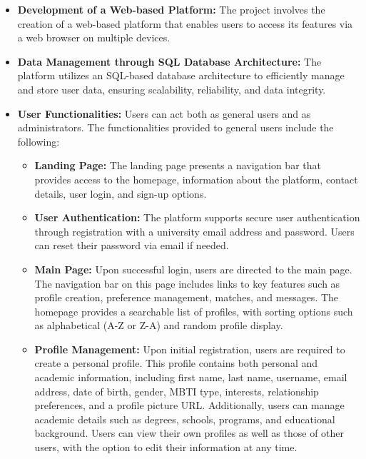 \begin{itemize} 

    \item \textbf{Development of a Web-based Platform:}
    The project involves the creation of a web-based platform that enables users to access its features via a web browser on multiple devices.
    
    \item \textbf{Data Management through SQL Database Architecture:}  
    The platform utilizes an SQL-based database architecture to efficiently manage and store user data, ensuring scalability, reliability, and data integrity.
    
    \item \textbf{User Functionalities:}  
    Users can act both as general users and as administrators. The functionalities provided to general users include the following:
    
    \begin{itemize}
        \item \textbf{Landing Page:}  
        The landing page presents a navigation bar that provides access to the homepage, information about the platform, contact details, user login, and sign-up options.

        \item \textbf{User Authentication:}  
        The platform supports secure user authentication through registration with a university email address and password. Users can reset their password via email if needed.
    
        \item \textbf{Main Page:}  
        Upon successful login, users are directed to the main page. The navigation bar on this page includes links to key features such as profile creation, preference management, matches, and messages.  The homepage provides a searchable list of profiles, with sorting options such as alphabetical (A-Z or Z-A) and random profile display.
    
        \item \textbf{Profile Management:}  
        Upon initial registration, users are required to create a personal profile. This profile contains both personal and academic information, including first name, last name, username, email address, date of birth, gender, MBTI type, interests, relationship preferences, and a profile picture URL. Additionally, users can manage academic details such as degrees, schools, programs, and educational background. Users can view their own profiles as well as those of other users, with the option to edit their information at any time.
    

\end{itemize}
\end{itemize}
